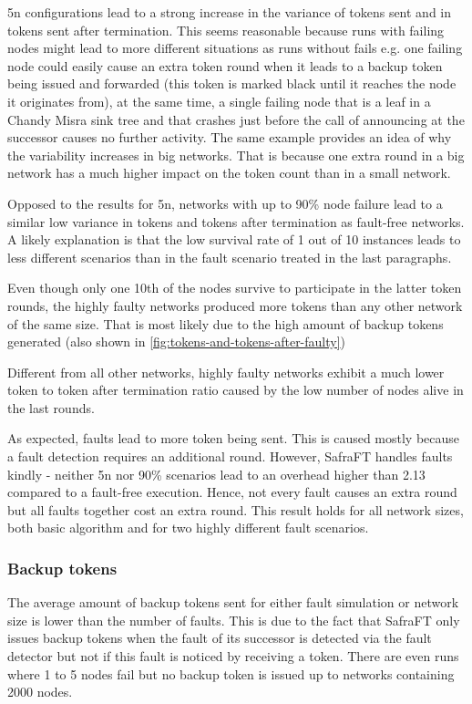 5n configurations lead to a strong increase in the variance of tokens sent and in tokens sent after termination.
This seems reasonable because runs with failing nodes might lead to more different situations as runs without fails e.g. one failing node could easily cause an extra token round when it leads to a backup token being issued and forwarded (this token is marked black until it reaches the node it originates from), at the same time, a single failing node that is a leaf in a Chandy Misra sink tree and that crashes just before the call of announcing at the successor  causes no further activity.
The same example provides an idea of why the variability increases in big networks.
That is because one extra round in a big network has a much higher impact on the token count than in a small network.

Opposed to the results for 5n, networks with up to 90\% node failure lead to a similar low variance in tokens and tokens after termination as fault-free networks.
A likely explanation is that the low survival rate of 1 out of 10 instances leads to less different scenarios than in the fault scenario treated in the last paragraphs.

Even though only one 10th of the nodes survive to participate in the latter token rounds, the highly faulty networks produced more tokens than any other network of the same size.
That is most likely due to the high amount of backup tokens generated (also shown in \cref{fig:tokens-and-tokens-after-faulty})

Different from all other networks, highly faulty networks exhibit a much lower token to token after termination ratio caused by the low number of nodes alive in the last rounds.

As expected, faults lead to more token being sent.
This is caused mostly because a fault detection requires an additional round.
However, SafraFT handles faults kindly - neither 5n nor 90\% scenarios lead to an overhead higher than 2.13 compared to a fault-free execution.
Hence, not every fault causes an extra round but all faults together cost an extra round.
This result holds for all network sizes, both basic algorithm and for two highly different fault scenarios.

\subsubsection{Backup tokens}
The average amount of backup tokens sent for either fault simulation or network size is lower than the number of faults.
This is due to the fact that SafraFT only issues backup tokens when the fault of its successor is detected via the fault detector but not if this fault is noticed by receiving a token.
There are even runs where 1 to 5 nodes fail but no backup token is issued up to networks containing 2000 nodes.


